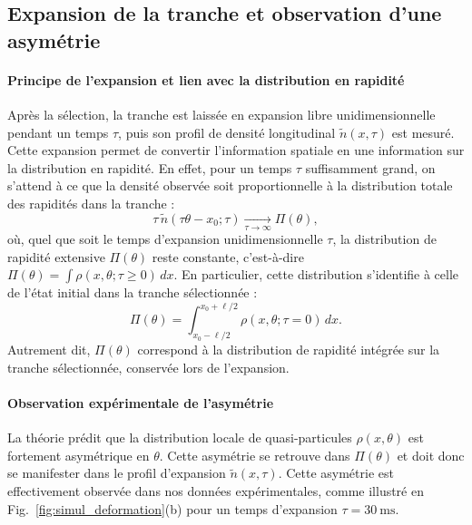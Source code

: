 \subsection{Expansion de la tranche et observation d’une asymétrie}

\paragraph{Principe de l’expansion et lien avec la distribution en rapidité}

Après la sélection, la tranche est laissée en expansion libre unidimensionnelle pendant un temps $\tau$, puis son profil de densité longitudinal $\tilde{n}(x,\tau)$ est mesuré. Cette expansion permet de convertir l’information spatiale en une information sur la distribution en rapidité. En effet, pour un temps $\tau$ suffisamment grand, on s’attend à ce que la densité observée soit proportionnelle à la distribution totale des rapidités dans la tranche :
\begin{equation}
\tau\, \tilde{n}(\tau \theta - x_0 ; \tau) \underset{\tau \to \infty}{\longrightarrow} \Pi(\theta),
\end{equation}
où, quel que soit le temps d'expansion unidimensionnelle $\tau$, la distribution de rapidité extensive $\Pi(\theta)$ reste constante, c’est-à-dire  $\Pi(\theta) = \int \rho(x, \theta ; \tau \geq 0)\, dx $. En particulier, cette distribution s’identifie à celle de l’état initial dans la tranche sélectionnée :
\begin{equation}
\Pi(\theta)  = \int_{x_0 - \ell/2}^{x_0 + \ell/2} \rho(x, \theta ; \tau = 0)\, dx.
\end{equation}
Autrement dit, $\Pi(\theta)$ correspond à la distribution de rapidité intégrée sur la tranche sélectionnée, conservée lors de l’expansion.

\paragraph{Observation expérimentale de l’asymétrie}

La théorie prédit que la distribution locale de quasi-particules $\rho(x,\theta)$ est fortement asymétrique en $\theta$. Cette asymétrie se retrouve dans $\Pi(\theta)$ et doit donc se manifester dans le profil d’expansion $\tilde{n}(x,\tau)$. Cette asymétrie est effectivement observée dans nos données expérimentales, comme illustré en Fig.~\ref{fig:simul_deformation}(b) pour un temps d’expansion $\tau = 30~\mathrm{ms}$. 


